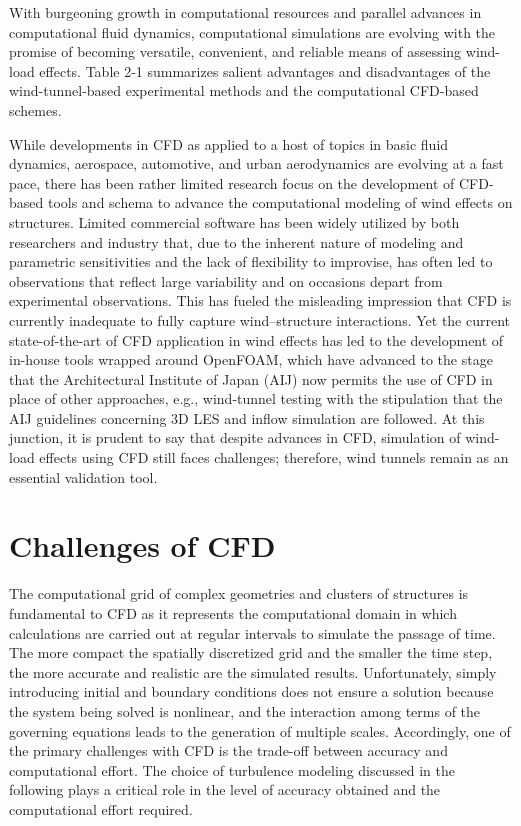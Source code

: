 With burgeoning growth in computational resources and parallel advances in computational fluid dynamics, computational simulations are evolving with the promise of becoming versatile, convenient, and reliable means of assessing wind-load effects. Table 2-1 summarizes salient advantages and disadvantages of the wind-tunnel-based experimental methods and the computational CFD-based schemes.

While developments in CFD as applied to a host of topics in basic fluid dynamics, aerospace, automotive, and urban aerodynamics are evolving at a fast pace, there has been rather limited research focus on the development of CFD-based tools and schema to advance the computational modeling of wind effects on structures. Limited commercial software has been widely utilized by both researchers and industry that, due to the inherent nature of modeling and parametric sensitivities and the lack of flexibility to improvise, has often led to observations that reflect large variability and on occasions depart from experimental observations. This has fueled the misleading impression that CFD is currently inadequate to fully capture wind–structure interactions. Yet the current state-of-the-art of CFD application in wind effects has led to the development of in-house tools wrapped around OpenFOAM, which have advanced to the stage that the Architectural Institute of Japan (AIJ) now permits the use of CFD in place of other approaches, e.g., wind-tunnel testing with the stipulation that the AIJ guidelines concerning 3D LES and inflow simulation are followed. At this junction, it is prudent to say that despite advances in CFD, simulation of wind-load effects using CFD still faces challenges; therefore, wind tunnels remain as an essential validation tool.
 
\section{Challenges of CFD}
\label{sec:resp_cfd_wind_challenges}

The computational grid of complex geometries and clusters of structures is fundamental to CFD as it represents the computational domain in which calculations are carried out at regular intervals to simulate the passage of time. The more compact the spatially discretized grid and the smaller the time step, the more accurate and realistic are the simulated results. Unfortunately, simply introducing initial and boundary conditions does not ensure a solution because the system being solved is nonlinear, and the interaction among terms of the governing equations leads to the generation of multiple scales. Accordingly, one of the primary challenges with CFD is the trade-off between accuracy and computational effort. The choice of turbulence modeling discussed in the following plays a critical role in the level of accuracy obtained and the computational effort required. 

